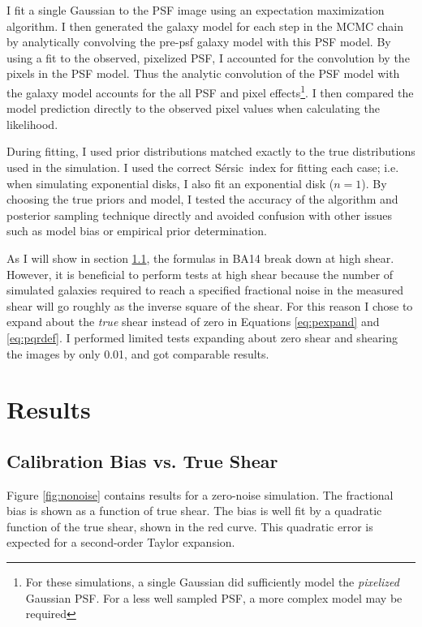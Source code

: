 \documentclass[12pt,preprint]{aastex}
\newcommand{\sersic}{S\'{e}rsic}
\begin{document}
I fit a single Gaussian to the PSF image using an expectation maximization
algorithm. I then generated the galaxy model for each step in the MCMC chain by
analytically convolving the pre-psf galaxy model with this PSF model.  By using
a fit to the observed, pixelized PSF, I accounted for the convolution by the
pixels in the PSF model.  Thus the analytic convolution of the PSF model with
the galaxy model accounts for the all PSF and pixel effects\footnote{For these
    simulations, a single Gaussian did sufficiently model the {\it pixelized}
Gaussian PSF. For a less well sampled PSF, a more complex model may be
required}.  I then compared the model prediction directly to the observed pixel
values when calculating the likelihood.


During fitting, I used prior distributions matched exactly to the true
distributions used in the simulation.  I used the correct \sersic\ index for
fitting each case; i.e. when simulating exponential disks, I also fit an
exponential disk ($n=1$).  By choosing the true priors and model, I tested the
accuracy of the algorithm and posterior sampling technique directly and avoided
confusion with other issues such as model bias or empirical prior
determination.

As I will show in section \ref{sec:truebias}, the formulas in BA14 break down
at high shear.  However, it is beneficial to perform tests at high shear
because the number of simulated galaxies required to reach a specified
fractional noise in the measured shear will go roughly as the inverse square of
the shear.  For this reason I chose to expand about the {\it true} shear
instead of zero in Equations \ref{eq:pexpand} and \ref{eq:pqrdef}.  I performed
limited tests expanding about zero shear and shearing the images by only 0.01,
and got comparable results. 

\section{Results} \label{sec:results}

\subsection{Calibration Bias vs. True Shear} \label{sec:truebias}

Figure \ref{fig:nonoise} contains results for a zero-noise simulation.  The
fractional bias is shown as a function of true shear.  The bias is well fit by
a quadratic function of the true shear, shown in the red curve. This quadratic
error is expected for a second-order Taylor expansion.
\end{document}
